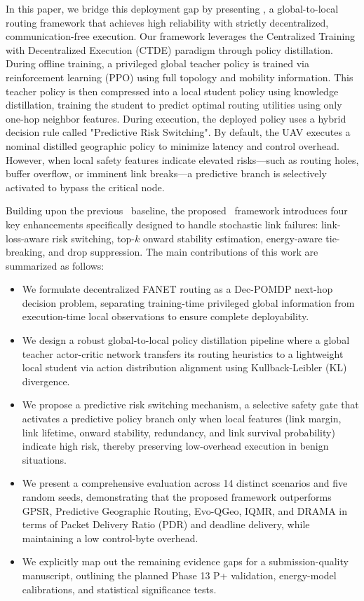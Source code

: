 In this paper, we bridge this deployment gap by presenting \method, a global-to-local routing framework that achieves high reliability with strictly decentralized, communication-free execution. Our framework leverages the Centralized Training with Decentralized Execution (CTDE) paradigm through policy distillation. During offline training, a privileged global teacher policy is trained via reinforcement learning (PPO) using full topology and mobility information. This teacher policy is then compressed into a local student policy using knowledge distillation, training the student to predict optimal routing utilities using only one-hop neighbor features. During execution, the deployed policy uses a hybrid decision rule called "Predictive Risk Switching". By default, the UAV executes a nominal distilled geographic policy to minimize latency and control overhead. However, when local safety features indicate elevated risks—such as routing holes, buffer overflow, or imminent link breaks—a predictive branch is selectively activated to bypass the critical node.

Building upon the previous \phaseTwelve\ baseline, the proposed \method\ framework introduces four key enhancements specifically designed to handle stochastic link failures: link-loss-aware risk switching, top-$k$ onward stability estimation, energy-aware tie-breaking, and drop suppression. The main contributions of this work are summarized as follows:
\begin{itemize}
    \item We formulate decentralized FANET routing as a Dec-POMDP next-hop decision problem, separating training-time privileged global information from execution-time local observations to ensure complete deployability.
    \item We design a robust global-to-local policy distillation pipeline where a global teacher actor-critic network transfers its routing heuristics to a lightweight local student via action distribution alignment using Kullback-Leibler (KL) divergence.
    \item We propose a predictive risk switching mechanism, a selective safety gate that activates a predictive policy branch only when local features (link margin, link lifetime, onward stability, redundancy, and link survival probability) indicate high risk, thereby preserving low-overhead execution in benign situations.
    \item We present a comprehensive evaluation across 14 distinct scenarios and five random seeds, demonstrating that the proposed framework outperforms GPSR, Predictive Geographic Routing, Evo-QGeo, IQMR, and DRAMA in terms of Packet Delivery Ratio (PDR) and deadline delivery, while maintaining a low control-byte overhead.
    \item We explicitly map out the remaining evidence gaps for a submission-quality manuscript, outlining the planned Phase 13 P+ validation, energy-model calibrations, and statistical significance tests.
\end{itemize}


